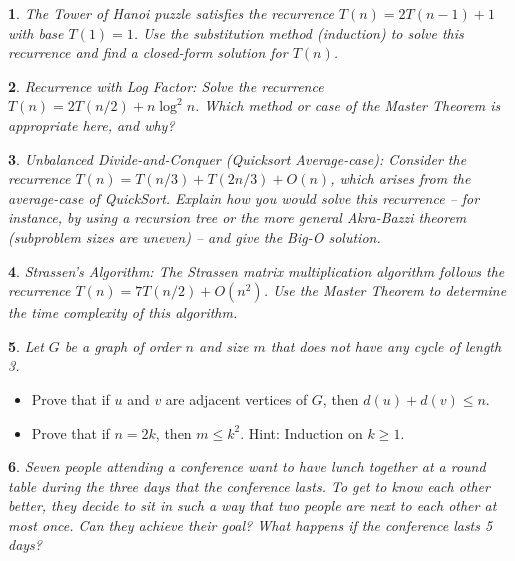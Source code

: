\documentclass[%
addpoints]{exam}
\theoremstyle{problem}
\newtheorem{p}{}
\begin{document}
\begin{p}
The Tower of Hanoi puzzle satisfies the recurrence \(T(n) = 2T(n-1) + 1\) with base \(T(1) = 1\). Use the substitution method (induction) to solve this recurrence and find a closed-form solution for \(T(n)\).  
\hfill\end{p}

\begin{p}
Recurrence with Log Factor: Solve the recurrence \(T(n) = 2T(n/2) + n \log^2 n\). Which method or case of the Master Theorem is appropriate here, and why?  
\hfill\end{p}

\begin{p}
Unbalanced Divide-and-Conquer (Quicksort Average-case): Consider the recurrence \(T(n) = T(n/3) + T(2n/3) + O(n)\), which arises from the average-case of QuickSort. Explain how you would solve this recurrence – for instance, by using a recursion tree or the more general Akra-Bazzi theorem (subproblem sizes are uneven) – and give the Big-O solution.  
\hfill\end{p}

\begin{p}
Strassen’s Algorithm: The Strassen matrix multiplication algorithm follows the recurrence \(T(n) = 7T(n/2) + O(n^2)\). Use the Master Theorem to determine the time complexity of this algorithm.  
\hfill\end{p}

\begin{p}
Let \( G \) be a graph of order \( n \) and size \( m \) that does not have any cycle of length 3.
\hfill\end{p}
\begin{itemize}
    \item Prove that if \( u \) and \( v \) are adjacent vertices of \( G \), then \( d(u) + d(v) \leq n \).
    \item Prove that if \( n = 2k \), then \( m \leq k^2 \). Hint: Induction on \( k \geq 1 \).
\end{itemize}

\begin{p}
Seven people attending a conference want to have lunch together at a round table during the three days that the conference lasts. To get to know each other better, they decide to sit in such a way that two people are next to each other at most once. Can they achieve their goal? What happens if the conference lasts 5 days?  
\hfill\end{p}
\end{document}
